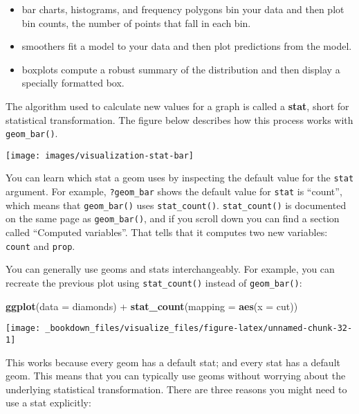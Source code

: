 \documentclass[]{book}
\newenvironment{Shaded}{\begin{snugshade}}{\end{snugshade}}
\newcommand{\KeywordTok}[1]{\textcolor[rgb]{0.13,0.29,0.53}{\textbf{{#1}}}}
\newcommand{\DataTypeTok}[1]{\textcolor[rgb]{0.13,0.29,0.53}{{#1}}}
\newcommand{\StringTok}[1]{\textcolor[rgb]{0.31,0.60,0.02}{{#1}}}
\newcommand{\NormalTok}[1]{{#1}}
\begin{document}
\begin{itemize}
\item
  bar charts, histograms, and frequency polygons bin your data and then
  plot bin counts, the number of points that fall in each bin.
\item
  smoothers fit a model to your data and then plot predictions from the
  model.
\item
  boxplots compute a robust summary of the distribution and then display
  a specially formatted box.
\end{itemize}

The algorithm used to calculate new values for a graph is called a
\textbf{stat}, short for statistical transformation. The figure below
describes how this process works with \texttt{geom\_bar()}.

\begin{center}\texttt{[image: images/visualization-stat-bar]} \end{center}

You can learn which stat a geom uses by inspecting the default value for
the \texttt{stat} argument. For example, \texttt{?geom\_bar} shows the
default value for \texttt{stat} is ``count'', which means that
\texttt{geom\_bar()} uses \texttt{stat\_count()}. \texttt{stat\_count()}
is documented on the same page as \texttt{geom\_bar()}, and if you
scroll down you can find a section called ``Computed variables''. That
tells that it computes two new variables: \texttt{count} and
\texttt{prop}.

You can generally use geoms and stats interchangeably. For example, you
can recreate the previous plot using \texttt{stat\_count()} instead of
\texttt{geom\_bar()}:

\begin{Shaded}
\begin{Highlighting}[]
\KeywordTok{ggplot}\NormalTok{(}\DataTypeTok{data =} \NormalTok{diamonds) +}\StringTok{ }
\StringTok{  }\KeywordTok{stat_count}\NormalTok{(}\DataTypeTok{mapping =} \KeywordTok{aes}\NormalTok{(}\DataTypeTok{x =} \NormalTok{cut))}
\end{Highlighting}
\end{Shaded}

\begin{center}\texttt{[image: \_bookdown\_files/visualize\_files/figure-latex/unnamed-chunk-32-1]} \end{center}

This works because every geom has a default stat; and every stat has a
default geom. This means that you can typically use geoms without
worrying about the underlying statistical transformation. There are
three reasons you might need to use a stat explicitly:
\end{document}
